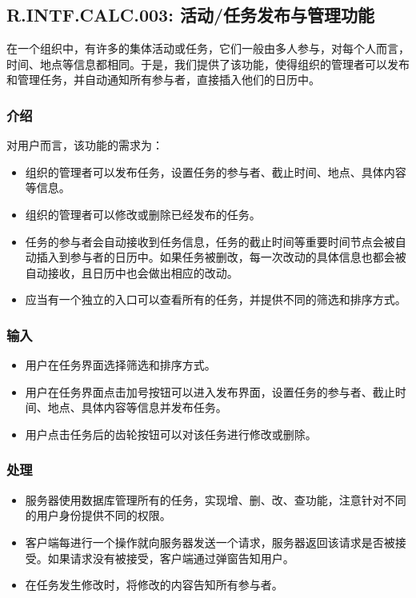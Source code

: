 \subsection{R.INTF.CALC.003: 活动/任务发布与管理功能}
在一个组织中，有许多的集体活动或任务，它们一般由多人参与，对每个人而言，时间、地点等信息都相同。于是，我们提供了该功能，使得组织的管理者可以发布和管理任务，并自动通知所有参与者，直接插入他们的日历中。
\subsubsection{介绍}
对用户而言，该功能的需求为：
\begin{itemize}
  \item 组织的管理者可以发布任务，设置任务的参与者、截止时间、地点、具体内容等信息。
  \item 组织的管理者可以修改或删除已经发布的任务。
  \item 任务的参与者会自动接收到任务信息，任务的截止时间等重要时间节点会被自动插入到参与者的日历中。如果任务被删改，每一次改动的具体信息也都会被自动接收，且日历中也会做出相应的改动。
  \item 应当有一个独立的入口可以查看所有的任务，并提供不同的筛选和排序方式。
\end{itemize}
\subsubsection{输入}
\begin{itemize}
  \item 用户在任务界面选择筛选和排序方式。
  \item 用户在任务界面点击加号按钮可以进入发布界面，设置任务的参与者、截止时间、地点、具体内容等信息并发布任务。
  \item 用户点击任务后的齿轮按钮可以对该任务进行修改或删除。
\end{itemize}
\subsubsection{处理}
\begin{itemize}
  \item 服务器使用数据库管理所有的任务，实现增、删、改、查功能，注意针对不同的用户身份提供不同的权限。
  \item 客户端每进行一个操作就向服务器发送一个请求，服务器返回该请求是否被接受。如果请求没有被接受，客户端通过弹窗告知用户。
  \item 在任务发生修改时，将修改的内容告知所有参与者。
\end{itemize}
